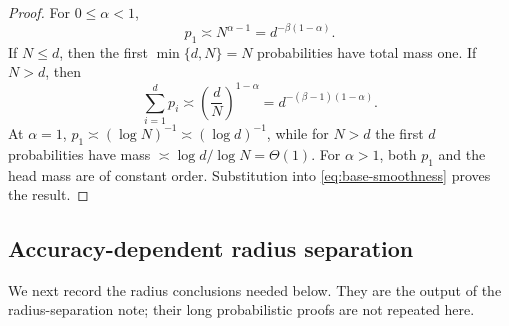 \documentclass[11pt]{article}
\begin{document}
\begin{proof}
For $0\leq\alpha<1$,
\[
 p_1\asymp N^{\alpha-1}=d^{-\beta(1-\alpha)}.
\]
If $N\leq d$, then the first $\min\{d,N\}=N$ probabilities have total
mass one.  If $N>d$, then
\[
 \sum_{i=1}^{d}p_i
 \asymp
 \left(\frac dN\right)^{1-\alpha}
 =d^{-(\beta-1)(1-\alpha)}.
\]
At $\alpha=1$,
$p_1\asymp(\log N)^{-1}\asymp(\log d)^{-1}$, while for $N>d$ the
first $d$ probabilities have mass
$\asymp\log d/\log N=\Theta(1)$.  For $\alpha>1$, both $p_1$ and the
head mass are of constant order.  Substitution into
\eqref{eq:base-smoothness} proves the result.
\end{proof}

\subsection{Accuracy-dependent radius separation}

We next record the radius conclusions needed below. They are the
output of the radius-separation note; their long probabilistic proofs are not repeated here.
\end{document}
